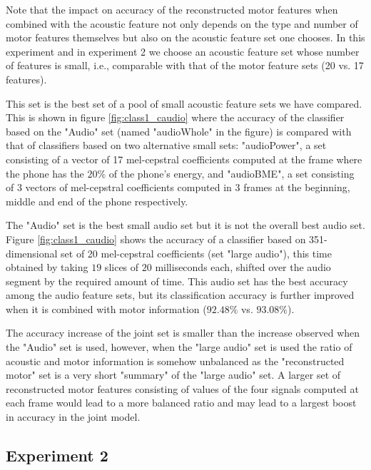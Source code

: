 Note that the impact on accuracy of the reconstructed motor features when combined with 
the acoustic feature not only depends on the type and number of motor features themselves 
but also on the acoustic feature set one chooses. 
In this experiment and in experiment 2 we choose an acoustic feature set whose number of features 
is small, i.e., comparable with that of the motor feature sets (20 vs. 17 features). 

This set is the best set of a pool of small acoustic feature sets we have compared. This is shown in figure \ref{fig:class1_caudio} where the accuracy of the classifier based on the "Audio" set (named "audioWhole" in the figure) is compared with that  of classifiers based on two alternative small sets: "audioPower", a set consisting of a vector of 17 mel-cepstral coefficients computed at the frame where the phone has the $20\%$ of the phone's energy, and "audioBME", a set consisting of $3$ vectors of mel-cepstral coefficients computed in $3$ frames at the beginning, middle and end of the phone respectively.

The "Audio" set is the best small audio set but it is not the overall best audio set. Figure \ref{fig:class1_caudio} shows the accuracy of a classifier based on 351-dimensional set of 20 mel-cepstral coefficients (set "large audio"), this time obtained by taking $19$ slices of $20$ milliseconds each, shifted over the audio segment by the required amount of time. This audio set has the best accuracy among the audio feature sets, but its classification accuracy is further improved when it is combined with motor information ($92.48\%$ vs. $93.08\%$). 

The accuracy increase of the joint set is smaller than the increase observed when the "Audio" set is used, however, when the "large audio" set is used the ratio of acoustic and motor information is somehow unbalanced as the "reconstructed motor" set is a very short "summary" of the "large audio" set. A larger set of reconstructed motor features consisting of values of the four signals computed at each frame would lead to a more balanced ratio and may lead to a largest boost in accuracy in the joint model.  



\subsection{Experiment 2}
\label{subsec:exp2}


